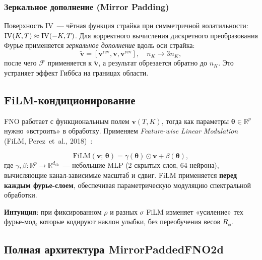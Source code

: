 \subsubsection{Зеркальное дополнение (Mirror Padding)}

Поверхность IV~--- чётная функция страйка при симметричной волатильности:
$\mathrm{IV}(K, T) \approx \mathrm{IV}(-K, T)$. Для корректного вычисления дискретного
преобразования Фурье применяется \textit{зеркальное дополнение} вдоль
оси страйка:
\[
  \tilde{\mathbf{v}} = [\mathbf{v}^{\mathrm{rev}}, \mathbf{v}, \mathbf{v}^{\mathrm{rev}}],
  \quad n_K \to 3n_K,
\]
после чего $\mathcal{F}$ применяется к $\tilde{\mathbf{v}}$, а результат
обрезается обратно до $n_K$. Это устраняет эффект Гиббса на границах области.

\subsection{FiLM-кондиционирование}

FNO работает с функциональным полем $\mathbf{v}(T,K)$, тогда как
параметры $\boldsymbol{\theta} \in \mathbb{R}^p$ нужно «встроить» в обработку.
Применяем \textit{Feature-wise Linear Modulation}
(FiLM, Perez~et~al., 2018)~\cite{Perez2018}:

\begin{equation}
  \label{eq:film}
  \mathrm{FiLM}(\mathbf{v};\,\boldsymbol{\theta}) = \gamma(\boldsymbol{\theta}) \odot \mathbf{v}
  + \beta(\boldsymbol{\theta}),
\end{equation}
где $\gamma, \beta: \mathbb{R}^p \to \mathbb{R}^{d_{\mathrm{ch}}}$~---
небольшие MLP (2 скрытых слоя, 64 нейрона), вычисляющие канал-зависимые
масштаб и сдвиг. FiLM применяется \textbf{перед каждым фурье-слоем},
обеспечивая параметрическую модуляцию спектральной обработки.

\textbf{Интуиция}: при фиксированном $\rho$ и разных $\sigma$ FiLM
изменяет «усиление» тех фурье-мод, которые кодируют наклон улыбки,
без переобучения весов $R_\phi$.

\subsection{Полная архитектура MirrorPaddedFNO2d}
\label{sec:full_arch}

